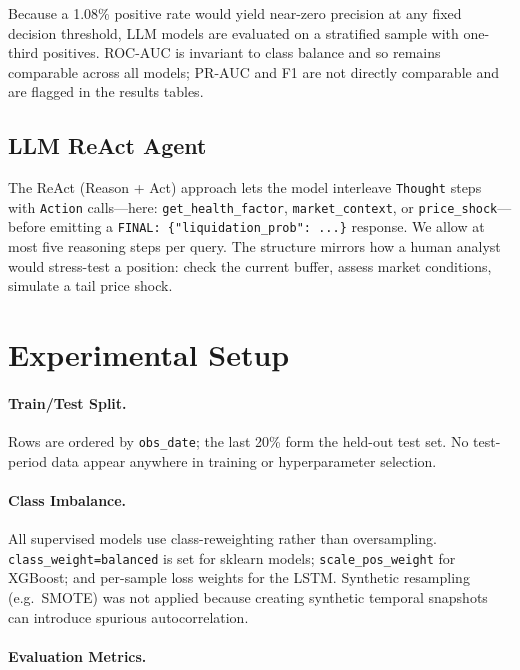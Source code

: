 \documentclass[12pt,a4paper]{article}
\begin{document}
Because a 1.08\% positive rate would yield near-zero precision at any fixed
decision threshold, LLM models are evaluated on a stratified sample with
one-third positives.  ROC-AUC is invariant to class balance and so remains
comparable across all models; PR-AUC and F1 are not directly comparable and
are flagged in the results tables.

\subsection{LLM ReAct Agent}

The ReAct (Reason + Act) approach \citep{yao2022react} lets the model
interleave \texttt{Thought} steps with \texttt{Action} calls---here:
\texttt{get\_health\_factor}, \texttt{market\_context}, or
\texttt{price\_shock}---before emitting a
\texttt{FINAL:\,\{"liquidation\_prob":\,...\}} response.  We allow at most
five reasoning steps per query.  The structure mirrors how a human analyst
would stress-test a position: check the current buffer, assess market
conditions, simulate a tail price shock.

\clearpage

\section{Experimental Setup}
\label{sec:setup}

\paragraph{Train/Test Split.}
Rows are ordered by \texttt{obs\_date}; the last 20\% form the held-out test
set.  No test-period data appear anywhere in training or hyperparameter
selection.

\paragraph{Class Imbalance.}
All supervised models use class-reweighting rather than oversampling.
\texttt{class\_weight=balanced} is set for sklearn models; \texttt{scale\_pos\_weight}
for XGBoost; and per-sample loss weights for the LSTM.  Synthetic resampling
(e.g.\ SMOTE) was not applied because creating synthetic temporal snapshots
can introduce spurious autocorrelation.

\paragraph{Evaluation Metrics.}
\end{document}
